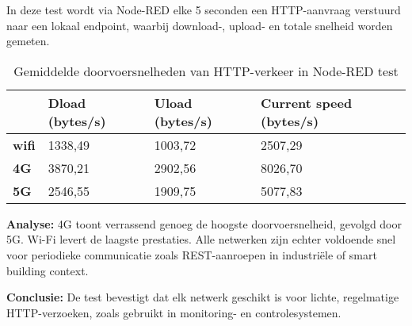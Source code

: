 In deze test wordt via Node-RED elke 5 seconden een HTTP-aanvraag verstuurd naar een lokaal endpoint, waarbij download-, upload- en totale snelheid worden gemeten.

\begin{table}[h]
    \caption{Gemiddelde doorvoersnelheden van HTTP-verkeer in Node-RED test}
    \begin{tabular}{l l l l}
        \cline{2-4}
        & \textbf{Dload (bytes/s)} & \textbf{Uload (bytes/s)} & \textbf{Current speed (bytes/s)} \\ \hline
        \multicolumn{1}{l}{\textbf{wifi}}       & 1338,49                     & 1003,72                    & 2507,29                             \\ \hline       
        \multicolumn{1}{l}{\textbf{4G}} & 3870,21                     & 2902,56                    & 8026,70                             \\ \hline
        \multicolumn{1}{l}{\textbf{5G}} & 2546,55                     & 1909,75                    & 5077,83                             \\ \hline
    \end{tabular}
    
\end{table}

\textbf{Analyse:} 4G toont verrassend genoeg de hoogste doorvoersnelheid, gevolgd door 5G. Wi-Fi levert de laagste prestaties. Alle netwerken zijn echter voldoende snel voor periodieke communicatie zoals REST-aanroepen in industriële of smart building context.

\textbf{Conclusie:} De test bevestigt dat elk netwerk geschikt is voor lichte, regelmatige HTTP-verzoeken, zoals gebruikt in monitoring- en controlesystemen.






